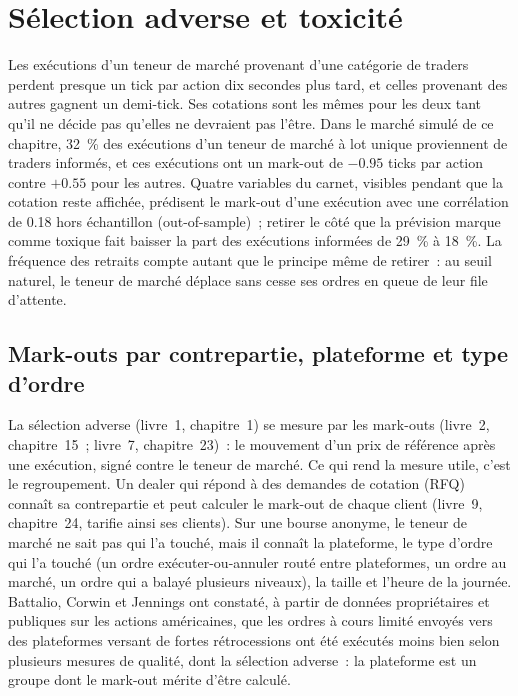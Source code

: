 \chapter{Sélection adverse et toxicité}\label{ch:hf:adverse-selection-and-toxicity}

Les exécutions d'un teneur de marché provenant d'une catégorie de traders perdent presque un tick par action dix secondes plus tard, et celles provenant des autres gagnent un demi-tick. Ses
cotations sont les mêmes pour les deux tant qu'il ne décide pas qu'elles ne devraient pas l'être. Dans le marché simulé de ce chapitre, 32~\% des exécutions d'un teneur de marché à lot unique proviennent
de traders informés, et ces exécutions ont un mark-out de $-0.95$ ticks par action contre $+0.55$ pour les autres. Quatre variables du carnet, visibles pendant que la
cotation reste affichée, prédisent le mark-out d'une exécution avec une corrélation de 0.18 hors échantillon (out-of-sample)~; retirer le côté que la prévision marque comme toxique fait baisser la part des exécutions informées
de 29~\% à 18~\%. La fréquence des retraits compte autant que le principe même de retirer~: au seuil naturel, le teneur de marché déplace sans cesse ses ordres
en queue de leur file d'attente.

\section{Mark-outs par contrepartie, plateforme et type d'ordre}

La sélection adverse (livre~1, chapitre~1) se mesure par les mark-outs (livre~2, chapitre~15~; livre~7, chapitre~23)~: le mouvement
d'un prix de référence après une exécution, signé contre le teneur de marché. Ce qui rend la mesure utile, c'est le regroupement. Un dealer qui répond à des demandes de
cotation (RFQ) connaît sa contrepartie et peut calculer le mark-out de chaque client (livre~9, chapitre~24, tarifie ainsi ses clients). Sur une bourse anonyme, le teneur
de marché ne sait pas qui l'a touché, mais il connaît la plateforme, le type d'ordre qui l'a touché (un ordre exécuter-ou-annuler routé entre plateformes, un ordre au
marché, un ordre qui a balayé plusieurs niveaux), la taille et l'heure de la journée. Battalio, Corwin et Jennings ont constaté, à partir de données propriétaires et publiques sur les actions américaines,
que les ordres à cours limité envoyés vers des plateformes versant de fortes rétrocessions ont été exécutés moins bien selon plusieurs mesures de qualité, dont la sélection adverse~: la
plateforme est un groupe dont le mark-out mérite d'être calculé.

